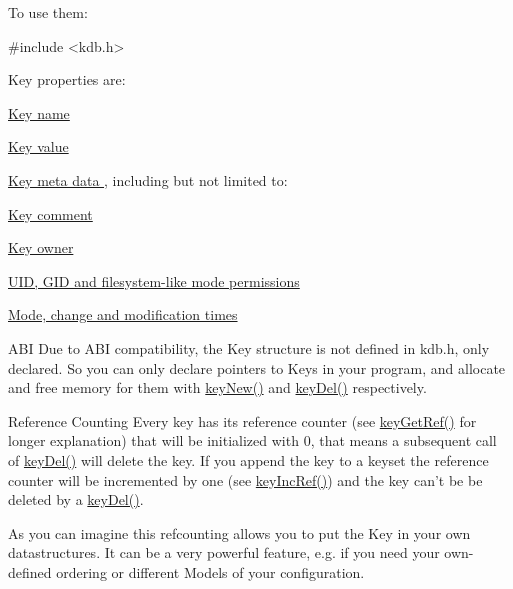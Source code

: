 To use them\-: 
\begin{DoxyCode}
\textcolor{preprocessor}{#include <kdb.h>}
\end{DoxyCode}


Key properties are\-:
\begin{DoxyItemize}
\item \hyperlink{group__keyname}{Key name }
\item \hyperlink{group__keyvalue}{Key value }
\item \hyperlink{group__keymeta}{Key meta data }, including but not limited to\-:
\begin{DoxyItemize}
\item \hyperlink{group__keyvalue_gafb89735689929ff717cc9f2d0d0b46a2}{Key comment }
\item \hyperlink{group__keyname_ga35922a017bee8b4bcb493bbdfad9d6f5}{Key owner }
\item \hyperlink{group__keymeta}{U\-I\-D, G\-I\-D and filesystem-\/like mode permissions }
\item \hyperlink{group__keymeta}{Mode, change and modification times }
\end{DoxyItemize}
\end{DoxyItemize}

\begin{DoxyParagraph}{A\-B\-I}
Due to A\-B\-I compatibility, the {\ttfamily Key} structure is not defined in kdb.\-h, only declared. So you can only declare {\ttfamily pointers} to {\ttfamily Keys} in your program, and allocate and free memory for them with \hyperlink{group__key_gad23c65b44bf48d773759e1f9a4d43b89}{key\-New()} and \hyperlink{group__key_ga3df95bbc2494e3e6703ece5639be5bb1}{key\-Del()} respectively.
\end{DoxyParagraph}
\begin{DoxyParagraph}{Reference Counting}
Every key has its reference counter (see \hyperlink{group__key_ga4aabc4272506dd63161db2bbb42de8ae}{key\-Get\-Ref()} for longer explanation) that will be initialized with 0, that means a subsequent call of \hyperlink{group__key_ga3df95bbc2494e3e6703ece5639be5bb1}{key\-Del()} will delete the key. If you append the key to a keyset the reference counter will be incremented by one (see \hyperlink{group__key_ga6970a6f254d67af7e39f8e469bb162f1}{key\-Inc\-Ref()}) and the key can't be be deleted by a \hyperlink{group__key_ga3df95bbc2494e3e6703ece5639be5bb1}{key\-Del()}.
\end{DoxyParagraph}
\begin{DoxyParagraph}{}
As you can imagine this refcounting allows you to put the Key in your own datastructures. It can be a very powerful feature, e.\-g. if you need your own-\/defined ordering or different Models of your configuration. 
\end{DoxyParagraph}


